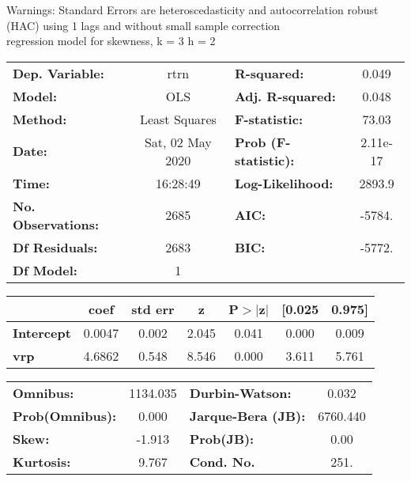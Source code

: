 Warnings: \newline
 [1] Standard Errors are heteroscedasticity and autocorrelation robust (HAC) using 1 lags and without small sample correction\\ 

regression model for skewness, k = 3 h = 2\begin{center}
\begin{tabular}{lclc}
\toprule
\textbf{Dep. Variable:}    &       rtrn       & \textbf{  R-squared:         } &     0.049   \\
\textbf{Model:}            &       OLS        & \textbf{  Adj. R-squared:    } &     0.048   \\
\textbf{Method:}           &  Least Squares   & \textbf{  F-statistic:       } &     73.03   \\
\textbf{Date:}             & Sat, 02 May 2020 & \textbf{  Prob (F-statistic):} &  2.11e-17   \\
\textbf{Time:}             &     16:28:49     & \textbf{  Log-Likelihood:    } &    2893.9   \\
\textbf{No. Observations:} &        2685      & \textbf{  AIC:               } &    -5784.   \\
\textbf{Df Residuals:}     &        2683      & \textbf{  BIC:               } &    -5772.   \\
\textbf{Df Model:}         &           1      & \textbf{                     } &             \\
\bottomrule
\end{tabular}
\begin{tabular}{lcccccc}
                   & \textbf{coef} & \textbf{std err} & \textbf{z} & \textbf{P$> |$z$|$} & \textbf{[0.025} & \textbf{0.975]}  \\
\midrule
\textbf{Intercept} &       0.0047  &        0.002     &     2.045  &         0.041        &        0.000    &        0.009     \\
\textbf{vrp}       &       4.6862  &        0.548     &     8.546  &         0.000        &        3.611    &        5.761     \\
\bottomrule
\end{tabular}
\begin{tabular}{lclc}
\textbf{Omnibus:}       & 1134.035 & \textbf{  Durbin-Watson:     } &    0.032  \\
\textbf{Prob(Omnibus):} &   0.000  & \textbf{  Jarque-Bera (JB):  } & 6760.440  \\
\textbf{Skew:}          &  -1.913  & \textbf{  Prob(JB):          } &     0.00  \\
\textbf{Kurtosis:}      &   9.767  & \textbf{  Cond. No.          } &     251.  \\
\bottomrule
\end{tabular}
\end{center}

